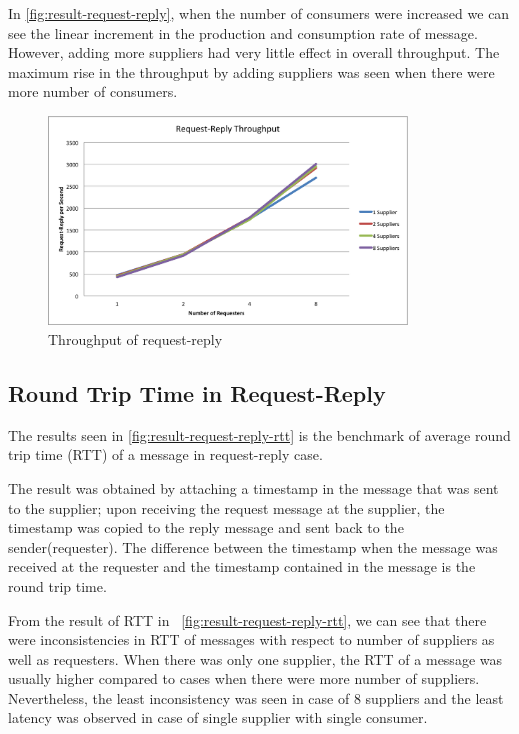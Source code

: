   In \autoref{fig:result-request-reply}, when the number of consumers were increased we can see the linear increment in the production and consumption rate of message. However, adding more suppliers had very little effect in overall throughput. The maximum rise in the throughput by adding suppliers was seen when there were more number of consumers.
\begin{figure}[H]
  \centering
  \includegraphics[width=0.85\textwidth]{figures/09request-reply}
  \caption[Throughput of request-reply]{Throughput of request-reply}
  \label{fig:result-request-reply}
\end{figure}

\subsection{Round Trip Time in Request-Reply}
\label{subsec:request-reply-rtt}
  The results seen in \autoref{fig:result-request-reply-rtt} is the benchmark of average round trip time (RTT) of a message in request-reply case.

  The result was obtained by attaching a timestamp in the message that was sent to the supplier; upon receiving the request message at the supplier, the timestamp was copied to the reply message and sent back to the sender(requester). The difference between the timestamp when the message was received at the requester and the timestamp contained in the message is the round trip time.

  From the result of RTT in ~\autoref{fig:result-request-reply-rtt}, we can see that there were inconsistencies in RTT of messages with respect to number of suppliers as well as requesters. When there was only one supplier, the RTT of a message was usually higher compared to cases when there were more number of suppliers. Nevertheless, the least inconsistency was seen in case of 8 suppliers and the least latency was observed in case of single supplier with single consumer.

